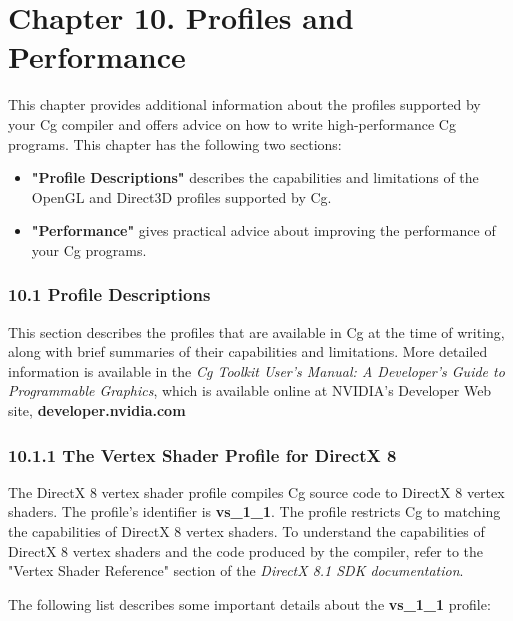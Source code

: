\documentclass[../main.tex]{subfiles}
\begin{document}
\chapter{Chapter 10. Profiles and Performance}

This chapter provides additional information about the profiles supported by your Cg compiler and offers advice on how to write high-performance Cg programs. This chapter has the following two sections:

\begin{itemize}
\item \textbf{"Profile Descriptions"} describes the capabilities and limitations of the OpenGL and Direct3D profiles supported by Cg.
\item \textbf{"Performance"} gives practical advice about improving the performance of your Cg programs.
\end{itemize}

\subsection{10.1 Profile Descriptions}

This section describes the profiles that are available in Cg at the time of writing, along with brief summaries of their capabilities and limitations. More detailed information is available in the \textit{Cg Toolkit User's Manual: A Developer's Guide to Programmable Graphics}, which is available online at NVIDIA's Developer Web site, \textbf{developer.nvidia.com}

\subsection{10.1.1 The Vertex Shader Profile for DirectX 8}

The DirectX 8 vertex shader profile compiles Cg source code to DirectX 8 vertex shaders. The profile's identifier is \textbf{vs_1_1}. The profile restricts Cg to matching the capabilities of DirectX 8 vertex shaders. To understand the capabilities of DirectX 8 vertex shaders and the code produced by the compiler, refer to the "Vertex Shader Reference" section of the \textit{DirectX 8.1 SDK documentation}.

The following list describes some important details about the \textbf{vs_1_1} profile:
\end{document}
